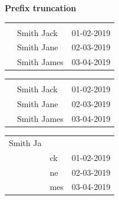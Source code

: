 \documentclass[usenames,dvipsnames, 18pt, compress, aspectratio=169]{beamer}
\newcounter{itemid}
\newcounter{itemid-prev}
\newcounter{itemid-next}
\newcommand{\btreenodewithitems}[5] {
    \node[btree-key, #4] (key#11) {};
    \forloop{itemid}{2}{\value{itemid} < #2} {
      \setcounter{itemid-prev}{\value{itemid} - 1}
      \ifthenelse{\number\value{itemid} < #3} {
        \node[btree-key, right=0.2cm of key#1\number\value{itemid-prev}]
          (key#1\number\value{itemid}) {};
      } {
        \node[btree-empty, right=0.2cm of key#1\number\value{itemid-prev}]
          (key#1\number\value{itemid}) {};
      }
    }
    \setcounter{itemid-prev}{\value{itemid} - 1}
    \node[btree-high-key, right=0.2cm of key#1\number\value{itemid-prev}]
        (high-key#1) {};
    \node[draw, inner sep=0.2cm, behind path, #5,
        fit=(high-key#1)\directlua{
          for index=1,#2-1 do
              tex.print("(key#1"..index..")")
          end}
    ] (node#1) {};

    \node[btree-key, #4] (key#11) {};
    \forloop{itemid}{2}{\value{itemid} < #2} {
      \setcounter{itemid-prev}{\value{itemid} - 1}
      \ifthenelse{\number\value{itemid} < #3} {
        \node[btree-key, right=0.2cm of key#1\number\value{itemid-prev}]
          (key#1\number\value{itemid}) {};
      } {
        \node[btree-empty, right=0.2cm of key#1\number\value{itemid-prev}]
          (key#1\number\value{itemid}) {};
      }
    }
    \setcounter{itemid-prev}{\value{itemid} - 1}
    \node[btree-high-key, right=0.2cm of key#1\number\value{itemid-prev}]
        (high-key#1) {};
}
\begin{document}
\begin{frame}[fragile]{}
    \frametitle{}

    \begin{center}
    \textbf{Prefix truncation}
    \vspace{1cm}

    \begin{overprint}[8cm]
        \begin{tabular}{lll}
            & & \\
            & Smith Jack & 01-02-2019 \\
            & Smith Jane & 02-03-2019 \\
            & Smith James & 03-04-2019 \\
        \end{tabular}

        \begin{tabular}{lll}
            & & \\
            & \colorbox{BurntOrange}{Smith Ja}ck & 01-02-2019 \\
            & \colorbox{BurntOrange}{Smith Ja}ne & 02-03-2019 \\
            & \colorbox{BurntOrange}{Smith Ja}mes & 03-04-2019 \\
        \end{tabular}

        \begin{tabular}{lll}
            \colorbox{BurntOrange}{Smith Ja} & & \\
            & ck & 01-02-2019 \\
            & ne & 02-03-2019 \\
            & mes & 03-04-2019 \\
        \end{tabular}

        \begin{center}
        \end{center}


\end{overprint}
\end{center}
\end{frame}
\end{document}
